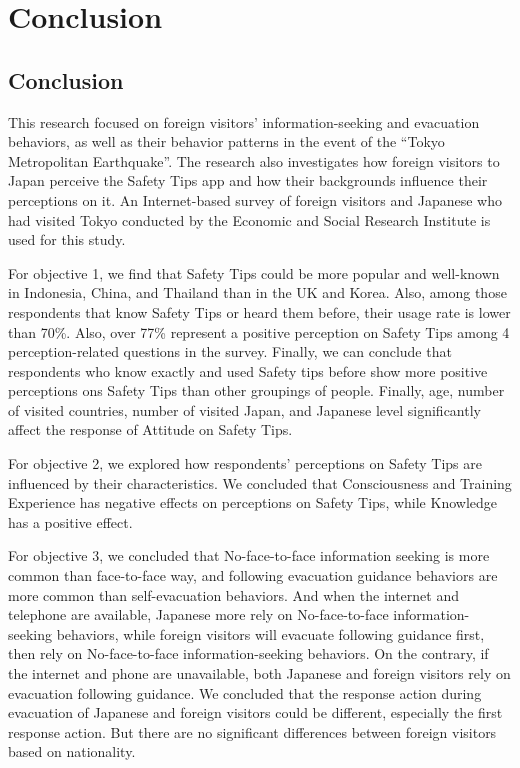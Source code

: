 


\chapter{Conclusion}
\label{c7}
\section{Conclusion}
This research focused on foreign visitors' information-seeking and evacuation behaviors, as well as their behavior patterns in the event of the “Tokyo Metropolitan Earthquake”. The research also investigates how foreign visitors to Japan perceive the Safety Tips app and how their backgrounds influence their perceptions on it. An Internet-based survey of foreign visitors and Japanese who had visited Tokyo conducted by the Economic and Social Research Institute is used for this study. 

For objective 1, we find that Safety Tips could be more popular and well-known in Indonesia, China, and Thailand than in the UK and Korea. Also, among those respondents that know Safety Tips or heard them before, their usage rate is lower than 70\%. Also, over 77\% represent a positive perception on Safety Tips among 4 perception-related questions in the survey. Finally, we can conclude that respondents who know exactly and used Safety tips before show more positive perceptions ons Safety Tips than other groupings of people. Finally, age, number of visited countries, number of visited Japan, and Japanese level significantly affect the response of Attitude on Safety Tips.

For objective 2, we explored how respondents' perceptions on Safety Tips are influenced by their characteristics. We concluded that Consciousness and Training Experience has negative effects on perceptions on Safety Tips, while Knowledge has a positive effect.

For objective 3, we concluded that No-face-to-face information seeking is more common than face-to-face way, and following evacuation guidance behaviors are more common than self-evacuation behaviors.  And when the internet and telephone are available, Japanese more rely on No-face-to-face information-seeking behaviors, while foreign visitors will evacuate following guidance first, then rely on No-face-to-face information-seeking behaviors. On the contrary, if the internet and phone are unavailable, both Japanese and foreign visitors rely on evacuation following guidance.  We concluded that the response action during evacuation of Japanese and foreign visitors could be different, especially the first response action. But there are no significant differences between foreign visitors based on nationality. 


